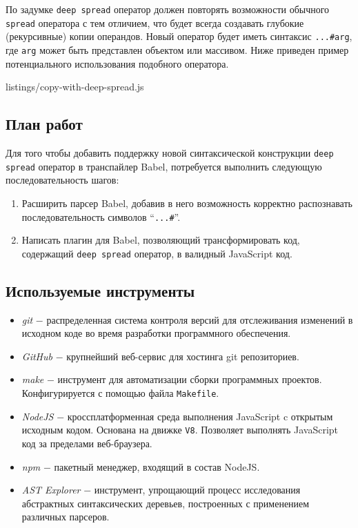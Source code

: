 \documentclass[14pt, a4paper]{article}
\def\code#1{\texttt{#1}} %
\begin{document}
По задумке \code{deep spread} оператор должен повторять возможности обычного \code{spread} оператора с тем отличием,
что будет всегда создавать глубокие (рекурсивные) копии операндов. Новый оператор будет иметь синтаксис \code{...\#arg},
где \code{arg} может быть представлен объектом или массивом. Ниже приведен пример потенциального 
использования подобного оператора.

  {listings/copy-with-deep-spread.js}

\subsection{План работ}
Для того чтобы добавить поддержку новой синтаксической конструкции \code{deep spread} оператор в 
транспайлер Babel, потребуется выполнить следующую последовательность шагов:
\begin{enumerate}
  \item Расширить парсер Babel, добавив в него возможность корректно распознавать последовательность символов 
    ``\code{...\#}''. 
  \item Написать плагин для Babel, позволяющий трансформировать код, содержащий \code{deep spread} оператор,
  в валидный JavaScript код.
  
\end{enumerate}

\subsection{Используемые инструменты}
\begin{itemize}
  \item \textit{git} $-$ распределенная система контроля версий для отслеживания изменений в исходном коде 
    во время разработки программного обеспечения.
  \item \textit{GitHub} $-$ крупнейший веб-сервис для хостинга git репозиториев.
  \item \textit{make} $-$ инструмент для автоматизации сборки программных проектов. Конфигурируется с помощью файла 
    \code{Makefile}.
  \item \textit{NodeJS} $-$ кроссплатформенная среда выполнения JavaScript c открытым исходным кодом.
    Основана на движке \code{V8}. Позволяет выполнять JavaScript код за пределами веб-браузера.
  \item \textit{npm} $-$ пакетный менеджер, входящий в состав NodeJS.
  \item \textit{AST Explorer} $-$ инструмент, упрощающий процесс исследования абстрактных 
    синтаксических деревьев, построенных с применением различных парсеров.
\end{itemize}
\end{document}
